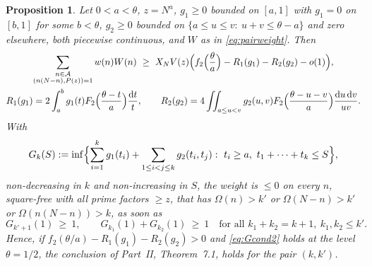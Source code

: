 \documentclass[11pt]{amsart}
\newtheorem{proposition}[theorem]{Proposition}
\theoremstyle{remark}
\newcommand{\cA}{\mathcal{A}}
\newcommand{\dd}{\mathrm{d}}
\begin{document}
\begin{proposition}\label{prop:pairsieve}
Let $0<a<\theta$, $z=N^a$, $g_1\ge0$ bounded on $[a,1]$ with $g_1=0$ on $[b,1]$ for some $b<\theta$, $g_2\ge0$ bounded on $\{a\le u\le v:\ u+v\le\theta-a\}$ and zero elsewhere, both piecewise continuous, and $W$ as in \eqref{eq:pairweight}. Then
\begin{gather*}
\sum_{\substack{n\in\cA\\ (n(N-n),P(z))=1}}w(n)W(n)\ \ge\ X_NV(z)\Bigl(f_2\Bigl(\frac\theta a\Bigr)-R_1(g_1)-R_2(g_2)-o(1)\Bigr),\\
R_1(g_1)=2\int_a^bg_1(t)F_2\Bigl(\frac{\theta-t}a\Bigr)\frac{\dd t}t,\qquad R_2(g_2)=4\iint_{a\le u<v}g_2(u,v)F_2\Bigl(\frac{\theta-u-v}a\Bigr)\frac{\dd u\,\dd v}{uv}.
\end{gather*}
With
\[
G_k(S):=\inf\Bigl\{\sum_{i=1}^kg_1(t_i)+\sum_{1\le i<j\le k}g_2(t_i,t_j):\ t_i\ge a,\ t_1+\cdots+t_k\le S\Bigr\},
\]
non-decreasing in $k$ and non-increasing in $S$, the weight is $\le0$ on every $n$, square-free with all prime factors $\ge z$, that has $\Omega(n)>k'$ or $\Omega(N-n)>k'$ or $\Omega(n(N-n))>k$, as soon as
\begin{equation}\label{eq:Gcond2}
G_{k'+1}(1)\ \ge\ 1,\qquad G_{k_1}(1)+G_{k_2}(1)\ \ge\ 1\quad\text{for all }k_1+k_2=k+1,\ k_1,k_2\le k'.
\end{equation}
Hence, if $f_2(\theta/a)-R_1(g_1)-R_2(g_2)>0$ and \eqref{eq:Gcond2} holds at the level $\theta=1/2$, the conclusion of Part~II, Theorem~7.1, holds for the pair $(k,k')$.
\end{proposition}
\end{document}
